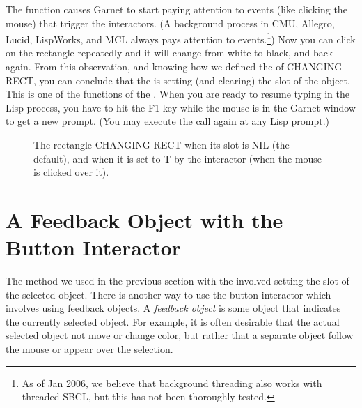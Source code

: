 The  function causes Garnet to start paying
attention to events (like clicking the mouse) that trigger the interactors.
(A background process in CMU, Allegro, Lucid, LispWorks, and MCL always
pays attention to events.\footnote{As of Jan 2006, we believe that
  background threading also works with threaded SBCL, but this has not
been thoroughly tested.})
Now you can click on the rectangle
repeatedly and it will change from white to black, and back again.
From this observation, and knowing how we defined the
 of CHANGING-RECT, you can conclude that the
 is setting (and clearing) the 
slot of the object.  This is one of the functions of the
.
When you are ready to resume typing in the Lisp process, you have to
hit the F1 key while the mouse is in the Garnet window to get a new
prompt.  (You may execute the  call again at any
Lisp prompt.)

\begin{figure}
\begin{center}
\begin{makeimage}
\end{makeimage}
\begin{latexonly}
\end{latexonly}
\begin{latexonly}
\end{latexonly}
\end{center}
\caption{The rectangle CHANGING-RECT when its  slot is NIL
(the default), and when it is set to T by the interactor (when the
mouse is clicked over it).}
\end{figure}


\section{A Feedback Object with the Button Interactor}
\label{button-feed}

The method we used in the previous section with the
 involved setting the  slot of the
selected object.  There is another way to use the button interactor
which involves using feedback objects.  A {\it feedback object} is some
object that indicates the currently selected object.  For example, it is
often desirable that the actual selected object not move or change
color, but rather that a separate object follow the mouse or appear
over the selection.

